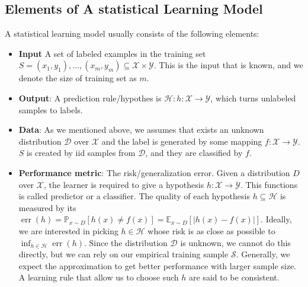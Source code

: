 \subsection{Elements of A statistical Learning Model}
A statistical learning model usually consists of the following elements:
\begin{itemize}
    \item \textbf{Input} A set of labeled examples in the training set  $S={(x_{1},y_{1}),...,(x_{m},y_{m})} \subseteq \mathcal{X} \times \mathcal{Y}$. This is the input that is known, and we denote the size of training set as $m$.
    \item \textbf{Output}: A prediction rule/hypothes is $ \mathcal{H}: h: \mathcal{X} \rightarrow \mathcal{Y} $, which turns unlabeled samples to labels.
    \item \textbf{Data}: As we mentioned above,  we assumes that exists an unknown distribution $\mathcal{D} $ over $\mathcal{X}$ and the label is generated by some mapping $f : \mathcal{X} \rightarrow \mathcal{Y}$. $S$ is created by iid samples from $\mathcal{D}$, and they are classified by $f$.
    
    \item \textbf{Performance metric}: The risk/generalization error. Given a distribution $D$ over $\mathcal{X}$, the learner is required to give a hypothesis $h : \mathcal{X} \rightarrow \mathcal{Y}$. This functions is called predictor or a classifier. The quality of each hypothesis $h \subseteq \mathcal{H}$ is measured by its $\operatorname{err}(h)=\mathbb{P}_{x \sim D}[h(x) \neq f(x)]=\mathbb{E}_{x \sim D}[|h(x)-f(x)|]$. Ideally, we are interested in picking $h \in \mathcal{H}$ whose risk is as close as possible to $\inf_{h \in \mathcal{H}} \operatorname{err}(h)$. Since the distribution $\mathcal{D}$ is unknown, we cannot do this directly, but we can rely on our empirical training sample $\mathcal{S}$. Generally, we expect the approximation to get better performance with larger sample size. A learning rule that allow us to choose such $h$ are said to be consistent. \cite{Hazan}\\
\end{itemize}   
    
